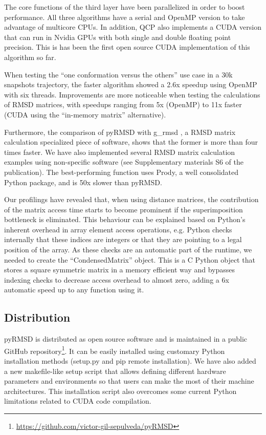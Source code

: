 The core functions of the third layer have been parallelized in order to boost performance. All three algorithms have a
serial and OpenMP version to take advantage of multicore CPUs. In addition, QCP also implements a CUDA version that can run in Nvidia GPUs with both single and double floating point precision. This is has been the first open source CUDA implementation of this algorithm so far.

When testing the ``one conformation versus the others'' use case in a 30k snapshots trajectory, the faster algorithm showed a
\around2.6x speedup using OpenMP with six threads. Improvements are more noticeable when testing the calculations of RMSD
matrices, with speedups ranging from 5x (OpenMP) to 11x faster (CUDA using the ``in-memory matrix'' alternative). 

Furthermore, the comparison of pyRMSD with g\_rmsd \cite{berendsen_gromacs_1995}, a RMSD matrix
calculation specialized piece of software, shows that the former is more than four times faster. We have also implemented
several RMSD matrix calculation examples using non-specific software (see Supplementary materials S6 of the
publication). The best-performing function uses Prody, a well consolidated Python package, and  is 50x slower than
pyRMSD.

Our profilings have revealed that, when using distance matrices, the contribution of the matrix access time starts to become prominent if the superimposition bottleneck is eliminated. This behaviour can be explained based on Python's inherent overhead in array element access operations, e.g. Python checks internally that these indices are integers or that they are pointing to a legal position of the array. As these checks are an automatic part of the runtime, we needed to create the ``CondensedMatrix'' object. This is a C Python object that stores a square symmetric matrix in a memory efficient
way and bypasses indexing checks to decrease access overhead to almost zero, adding a 6x automatic speed up to any
function using it.

\subsection{Distribution}

pyRMSD is distributed as open source software and is maintained in a public GitHub
repository\footnote{\url{https://github.com/victor-gil-sepulveda/pyRMSD}}. It can be easily installed using customary
Python installation methods (setup.py and pip remote installation). We have also added a new makefile-like setup script
that allows defining different hardware parameters and environments so that users can make the most of their machine architectures. This installation script also overcomes some current  Python limitations related to CUDA code compilation.

\newpage



